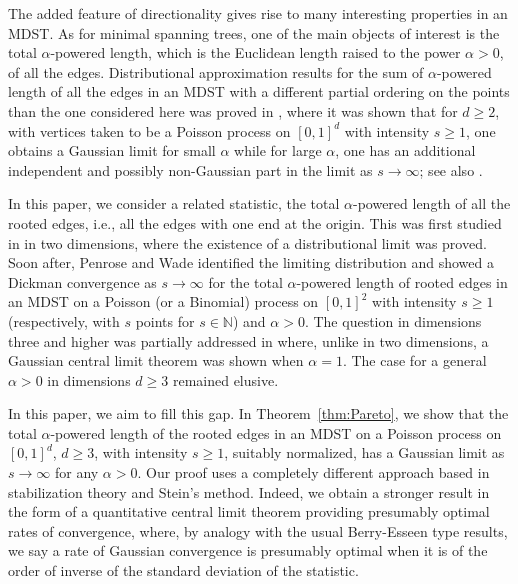 \documentclass[11pt,reqno]{amsart}
\numberwithin{equation}{section}
\theoremstyle{definition}
\newcommand{\N}{\mathbb{N}}
\begin{document}
The added feature of directionality gives rise to many interesting properties in an MDST. As for minimal spanning trees, one of the main objects of interest is the total $\alpha$-powered length, which is the Euclidean length raised to the power $\alpha>0$, of all the edges. Distributional approximation results for the sum of $\alpha$-powered length of all the edges in an MDST with a different partial ordering on the points than the one considered here was proved in \cite{PW10}, where it was shown that for $d \ge 2$, with vertices taken to be a Poisson process on $[0,1]^d$ with intensity $s \ge 1$, one obtains a Gaussian limit for small $\alpha$ while for large $\alpha$, one has an additional independent and possibly non-Gaussian part in the limit as $s \to \infty$; see also \cite{PW06}. 

In this paper, we consider a related statistic, the total $\alpha$-powered length of all the rooted edges, i.e., all the edges with one end at the origin. This was first studied in \cite{BR04} in two dimensions, where the existence of a distributional limit was proved. Soon after, Penrose and Wade \cite{PW04} identified the limiting distribution and showed a Dickman convergence as $s \to \infty$ for the total $\alpha$-powered length of rooted edges in an MDST on a Poisson (or a Binomial) process on $[0,1]^2$ with intensity $s \ge 1$ (respectively, with $s$ points for $s \in \N$) and $\alpha>0$. The question in dimensions three and higher was partially addressed in \cite{BLP06} where, unlike in two dimensions, a Gaussian central limit theorem was shown when $\alpha=1$. The case for a general $\alpha>0$ in dimensions $d \ge 3$ remained elusive.

In this paper, we aim to fill this gap. In Theorem~\ref{thm:Pareto}, we show that the total $\alpha$-powered length of the rooted edges in an MDST on a Poisson process on $[0,1]^d$, $d \ge 3$, with intensity $s \ge 1$, suitably normalized, has a Gaussian limit as $s \to \infty$ for any $\alpha>0$. Our proof uses a completely different approach based in stabilization theory and Stein's method. Indeed, we obtain a stronger result in the form of a quantitative central limit theorem providing presumably optimal rates of convergence, where, by analogy with the usual Berry-Esseen type results, we say a rate of Gaussian convergence is presumably optimal when it is of the order of inverse of the standard deviation of the statistic.
\end{document}
